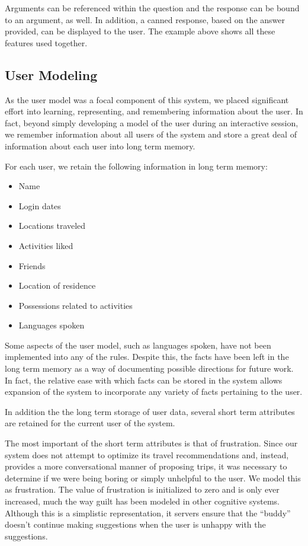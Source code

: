 \documentclass[11pt]{article} %
\begin{document}
Arguments can be referenced within the question and the response can be bound to an argument, as well. In addition, a canned response, based on the answer provided, can be displayed to the user. The example above shows all these features used together.

\subsection{User Modeling}

As the user model was a focal component of this system, we placed significant effort into learning, representing, and remembering information about the user. In fact, beyond simply developing a model of the user during an interactive session, we remember information about all users of the system and store a great deal of information about each user into long term memory.

For each user, we retain the following information in long term memory:
\begin{multicols}{2}
\begin{itemize}
\setlength\itemsep{0em}
\item Name
\item Login dates
\item Locations traveled
\item Activities liked
\item Friends
\item Location of residence
\item Possessions related to activities
\item Languages spoken
\end{itemize}
\end{multicols}

Some aspects of the user model, such as languages spoken, have not been implemented into any of the rules. Despite this, the facts have been left in the long term memory as a way of documenting possible directions for future work. In fact, the relative ease with which facts can be stored in the system allows expansion of the system to incorporate any variety of facts pertaining to the user.

In addition the the long term storage of user data, several short term attributes are retained for the current user of the system.

The most important of the short term attributes is that of frustration. Since our system does not attempt to optimize its travel recommendations and, instead, provides a more conversational manner of proposing trips, it was necessary to determine if we were being boring or simply unhelpful to the user. We model this as frustration. The value of frustration is initialized to zero and is only ever increased, much the way guilt has been modeled in other cognitive systems\cite{arkin09}. Although this is a simplistic representation, it servers ensure that the ``buddy'' doesn't continue making suggestions when the user is unhappy with the suggestions.
\end{document}
